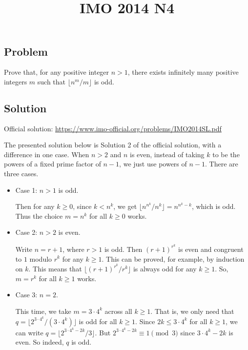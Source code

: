 \documentclass{article}
\title{IMO 2014 N4}
\author{}
\date{}
\begin{document}
\maketitle



\subsection*{Problem}

Prove that, for any positive integer $n > 1$, there exists infinitely many positive integers $m$ such that $\lfloor n^m/m \rfloor$ is odd.



\subsection*{Solution}

Official solution: \url{https://www.imo-official.org/problems/IMO2014SL.pdf}

The presented solution below is Solution 2 of the official solution, with a difference in one case.
When $n > 2$ and $n$ is even, instead of taking $k$ to be the powers of a fixed prime factor of $n - 1$, we just use powers of $n - 1$.
There are three cases.

\begin{itemize}

    \item 
    Case 1: $n > 1$ is odd.

    Then for any $k \geq 0$, since $k < n^k$, we get $\lfloor n^{n^k}/n^k \rfloor = n^{n^k - k}$, which is odd.
    Thus the choice $m = n^k$ for all $k \geq 0$ works.

    \item
    Case 2: $n > 2$ is even.

    Write $n = r + 1$, where $r > 1$ is odd.
    Then $(r + 1)^{r^k}$ is even and congruent to $1$ modulo $r^k$ for any $k \geq 1$.
    This can be proved, for example, by induction on $k$.
    This means that $\lfloor (r + 1)^{r^k}/r^k \rfloor$ is always odd for any $k \geq 1$.
    So, $m = r^k$ for all $k \geq 1$ works.

    \item
    Case 3: $n = 2$.

    This time, we take $m = 3 \cdot 4^k$ across all $k \geq 1$.
    That is, we only need that $q = \lfloor 2^{3 \cdot 4^k}/(3 \cdot 4^k) \rfloor$ is odd for all $k \geq 1$.
    Since $2k \leq 3 \cdot 4^k$ for all $k \geq 1$, we can write $q = \lfloor 2^{3 \cdot 4^k - 2k}/3 \rfloor$.
    But $2^{3 \cdot 4^k - 2k} \equiv 1 \pmod{3}$ since $3 \cdot 4^k - 2k$ is even.
    So indeed, $q$ is odd.

\end{itemize}
\end{document}
